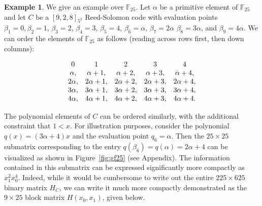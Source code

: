 \documentclass[11pt]{amsart}
\theoremstyle{definition}
\newtheorem{example}[theorem]{Example}
\newcommand{\0}{\mathbf{0}}
\newcommand{\F}{\mathbb{F}}
\begin{document}
\begin{example} \label{ex:gf25}
    We give an example over $\F_{25}$. Let $\alpha$ be a primitive element of $\F_{25}$ and let $C$ be a $[9,2,8]_{5^2}$ Reed-Solomon code with evaluation points $\beta_1=0, \beta_2=1$, $\beta_3=2$, $\beta_4=3$, $\beta_5=4$, $\beta_6=\alpha$, $\beta_7=2\alpha$ $\beta_8=3\alpha$, and $\beta_9=4\alpha$. We can order the elements of $\F_{25}$ as follows (reading across rows first, then down columns):

    \[ \begin{array}{c c c c c}
        0 & 1 & 2 & 3 & 4 \\
        \alpha, & \alpha+1, & \alpha+2, & \alpha+3, & \alpha+4, \\
        2\alpha, & 2\alpha+1, & 2\alpha+2, & 2\alpha+3, & 2\alpha+4, \\
        3\alpha, & 3\alpha+1, & 3\alpha+2, & 3\alpha+3, & 3\alpha+4, \\
        4\alpha, & 4\alpha+1, & 4\alpha+2, & 4\alpha+3, & 4\alpha+4.
    \end{array}\]

    The polynomial elements of $C$ can be ordered similarly, with the additional constraint that $1 < x$. For illustration purposes, consider the polynomial $q(x)=(3\alpha+4)x$ and the evaluation point $q_6=\alpha$. Then the $25 \times 25$ submatrix corresponding to the entry $q(\beta_6)=q(\alpha)=2\alpha+4$ can be visualized as shown in Figure~\ref{fig:gf25} (see Appendix). The information contained in this submatrix can be expressed significantly more compactly as $x_1^2 x_0^4$. Indeed, while it would be cumbersome to write out the entire $225 \times 625$ binary matrix $H_C$, we can write it much more compactly demonstrated as the $9 \times 25$ block matrix $H(x_0,x_1)$, given below.


\end{example}
\end{document}
